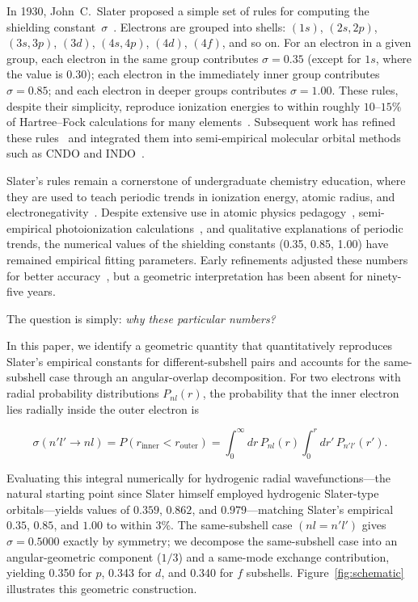 \documentclass[11pt,a4paper]{article}
\begin{document}
In 1930, John~C.~Slater proposed a simple set of rules for computing the shielding constant~$\sigma$~\citet{slater1930}. Electrons are grouped into shells: $(1s)$, $(2s,2p)$, $(3s,3p)$, $(3d)$, $(4s,4p)$, $(4d)$, $(4f)$, and so on. For an electron in a given group, each electron in the same group contributes $\sigma = 0.35$ (except for $1s$, where the value is $0.30$); each electron in the immediately inner group contributes $\sigma = 0.85$; and each electron in deeper groups contributes $\sigma = 1.00$. These rules, despite their simplicity, reproduce ionization energies to within roughly $10$--$15\%$ of Hartree--Fock calculations for many elements~\citep{clementi1963}. Subsequent work has refined these rules~\citep{clementi1967} and integrated them into semi-empirical molecular orbital methods such as CNDO and INDO~\citep{pople1965}.

Slater's rules remain a cornerstone of undergraduate chemistry education, where they are used to teach periodic trends in ionization energy, atomic radius, and electronegativity~\citep{waldron2001}. Despite extensive use in atomic physics pedagogy~\citep{viswanathan2024}, semi-empirical photoionization calculations~\citep{sakho2018}, and qualitative explanations of periodic trends, the numerical values of the shielding constants (0.35, 0.85, 1.00) have remained empirical fitting parameters. Early refinements adjusted these numbers for better accuracy~\citep{sakai1974}, but a geometric interpretation has been absent for ninety-five years.

The question is simply: \textit{why these particular numbers?}

In this paper, we identify a geometric quantity that quantitatively reproduces Slater's empirical constants for different-subshell pairs and accounts for the same-subshell case through an angular-overlap decomposition. For two electrons with radial probability distributions $P_{nl}(r)$, the probability that the inner electron lies radially inside the outer electron is

\begin{equation}\label{eq:core}
\sigma(n'l' \rightarrow nl) = P(r_{\mathrm{inner}} < r_{\mathrm{outer}})
= \int_0^\infty dr\, P_{nl}(r) \int_0^r dr'\, P_{n'l'}(r').
\end{equation}

Evaluating this integral numerically for hydrogenic radial wavefunctions---the natural starting point since Slater himself employed hydrogenic Slater-type orbitals---yields values of $0.359$, $0.862$, and $0.979$---matching Slater's empirical $0.35$, $0.85$, and $1.00$ to within 3\%. The same-subshell case $(nl = n'l')$ gives $\sigma = 0.5000$ exactly by symmetry; we decompose the same-subshell case into an angular-geometric component ($1/3$) and a same-mode exchange contribution, yielding 0.350 for $p$, 0.343 for $d$, and 0.340 for $f$ subshells. Figure~\ref{fig:schematic} illustrates this geometric construction.
\end{document}
